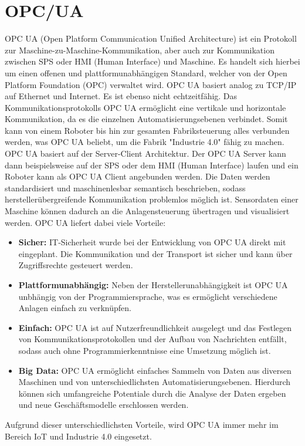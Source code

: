\documentclass[ a4paper,
                oneside,
                toc=bibliography,
                toc=listof
                ]{scrbook}
\begin{document}
   	\section{OPC/UA}
   	OPC UA (Open Platform Communication Unified Architecture) ist ein Protokoll zur Maschine-zu-Maschine-Kommunikation, aber auch zur Kommunikation zwischen SPS oder HMI (Human Interface) und Maschine. Es handelt sich hierbei um einen offenen und plattformunabhängigen Standard, welcher von der Open Platform Foundation (OPC) verwaltet wird. OPC UA basiert analog zu TCP/IP auf Ethernet und Internet. Es ist ebenso nicht echtzeitfähig. Das Kommunikationsprotokolls OPC UA ermöglicht eine vertikale und horizontale Kommunikation, da es die einzelnen Automatisierungsebenen verbindet. Somit kann von einem Roboter bis hin zur gesamten Fabriksteuerung alles verbunden werden, was OPC UA beliebt, um die Fabrik "Industrie 4.0" fähig zu machen. \cite{industrie40} \\
   	OPC UA basiert auf der Server-Client Architektur. Der OPC UA Server kann dann beispielsweise auf der SPS oder dem HMI (Human Interface) laufen und ein Roboter kann als OPC UA Client angebunden werden. Die Daten werden standardisiert und maschinenlesbar semantisch beschrieben, sodass herstellerübergreifende Kommunikation problemlos möglich ist. Sensordaten einer Maschine können dadurch an die Anlagensteuerung übertragen und visualisiert werden. OPC UA liefert dabei viele Vorteile: \cite{OPCUA}
   	\begin{itemize}
   		\item \textbf{Sicher:} IT-Sicherheit wurde bei der Entwicklung von OPC UA direkt mit eingeplant. Die Kommunikation und der Transport ist sicher und kann über Zugriffsrechte gesteuert werden.
   		\item \textbf{Plattformunabhängig:} Neben der Herstellerunabhängigkeit ist OPC UA unbhängig von der Programmiersprache, was es ermöglicht verschiedene Anlagen einfach zu verknüpfen.
   		\item \textbf{Einfach:} OPC UA ist auf Nutzerfreundlichkeit ausgelegt und das Festlegen von Kommunikationsprotokollen und der Aufbau von Nachrichten entfällt, sodass auch ohne Programmierkenntnisse eine Umsetzung möglich ist. 
   		\item \textbf{Big Data:} OPC UA ermöglicht einfaches Sammeln von Daten aus diversen Maschinen und von unterschiedlichsten Automatisierungsebenen. Hierdurch können sich umfangreiche Potentiale durch die Analyse der Daten ergeben und neue Geschäftsmodelle erschlossen werden. \\
   	\end{itemize}
   	Aufgrund dieser unterschiedlichsten Vorteile, wird OPC UA immer mehr im Bereich IoT und Industrie 4.0 eingesetzt. \cite{OPCUA}  \cite{industrie40}
   	
\end{document}

